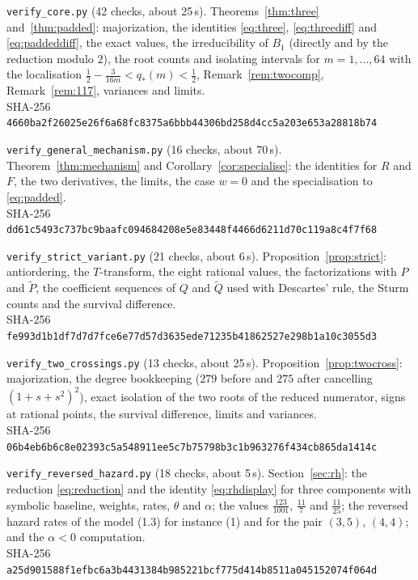 \documentclass[10pt]{article}
\theoremstyle{plain}
\theoremstyle{definition}
\theoremstyle{remark}
\begin{document}
\begin{list}{}{\setlength{\leftmargin}{1em}\setlength{\itemsep}{2pt}\small}
\item \texttt{verify\_core.py} (42 checks, about 25\,s). Theorems~\ref{thm:three} and~\ref{thm:padded}: majorization, the identities \eqref{eq:three}, \eqref{eq:threediff} and \eqref{eq:paddeddiff}, the exact values, the irreducibility of $B_1$ (directly and by the reduction modulo $2$), the root counts and isolating intervals for $m=1,\dots,64$ with the localisation $\tfrac12-\tfrac{3}{16m}<q_*(m)<\tfrac12$, Remark~\ref{rem:twocomp}, Remark~\ref{rem:117}, variances and limits.\\
SHA-256 \texttt{4660ba2f26025e26f6a68fc8375a6bbb44306bd258d4cc5a203e653a28818b74}
\item \texttt{verify\_general\_mechanism.py} (16 checks, about 70\,s). Theorem~\ref{thm:mechanism} and Corollary~\ref{cor:specialise}: the identities for $R$ and $F$, the two derivatives, the limits, the case $w=0$ and the specialisation to \eqref{eq:padded}.\\
SHA-256 \texttt{dd61c5493c737bc9baafc094684208e5e83448f4466d6211d70c119a8c4f7f68}
\item \texttt{verify\_strict\_variant.py} (21 checks, about 6\,s). Proposition~\ref{prop:strict}: antiordering, the $T$-transform, the eight rational values, the factorizations with $P$ and $\tilde P$, the coefficient sequences of $Q$ and $\tilde Q$ used with Descartes' rule, the Sturm counts and the survival difference.\\
SHA-256 \texttt{fe993d1b1df7d7d7fce6e77d57d3635ede71235b41862527e298b1a10c3055d3}
\item \texttt{verify\_two\_crossings.py} (13 checks, about 25\,s). Proposition~\ref{prop:twocross}: majorization, the degree bookkeeping ($279$ before and $275$ after cancelling $(1+s+s^2)^2$), exact isolation of the two roots of the reduced numerator, signs at rational points, the survival difference, limits and variances.\\
SHA-256 \texttt{06b4eb6b6c8e02393c5a548911ee5c7b75798b3c1b963276f434cb865da1414c}
\item \texttt{verify\_reversed\_hazard.py} (18 checks, about 5\,s). Section~\ref{sec:rh}: the reduction \eqref{eq:reduction} and the identity \eqref{eq:rhdisplay} for three components with symbolic baseline, weights, rates, $\theta$ and $\alpha$; the values $\tfrac{123}{1001}$, $\tfrac{11}{7}$ and $\tfrac{11}{25}$; the reversed hazard rates of the model (1.3) for instance (1) and for the pair $(3,5)$, $(4,4)$; and the $\alpha<0$ computation.\\
SHA-256 \texttt{a25d901588f1efbc6a3b4431384b985221bcf775d414b8511a045152074f064d}
\end{list}
\end{document}
